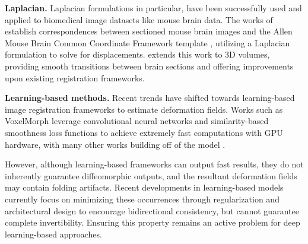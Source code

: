 \documentclass[lettersize,journal]{IEEEtran}
\begin{document}
\textbf{Laplacian.}
Laplacian formulations in particular, have been successfully used and applied to biomedical image datasets like mouse brain data. The works of \cite{AgarwalRobustRegistration, AgarwalXG16, AGARWAL201845} establish correspondences between sectioned mouse brain images and the Allen Mouse Brain Common Coordinate Framework template \cite{WANG2020936}, utilizing a Laplacian formulation to solve for displacements. \cite{RegBoost2025} extends this work to 3D volumes, providing smooth transitions between brain sections and offering improvements upon existing registration frameworks.



\textbf{Learning-based methods.}
Recent trends have shifted towards learning-based image registration frameworks to estimate deformation fields. Works such as VoxelMorph \cite{VoxelMorph2019} leverage convolutional neural networks and similarity-based smoothness loss functions to achieve extremely fast computations with GPU hardware, with many other works building off of the model \cite{Hoopes2021HyperMorph, hoffmann2022synthmorph, CHEN2022102615}.

However, although learning-based frameworks can output fast results, they do not inherently guarantee diffeomorphic outputs, and the resultant deformation fields may contain folding artifacts. Recent developments in learning-based models currently focus on minimizing these occurrences through regularization and architectural design \cite{Dalca2018, KIM2021CycleMorph, Huang2023} to encourage bidirectional consistency, but cannot guarantee complete invertibility. Ensuring this property remains an active problem for deep learning-based approaches.
\end{document}
